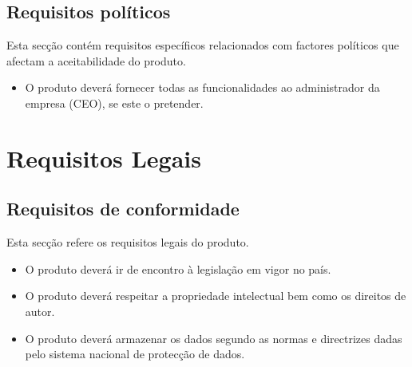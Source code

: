 \subsection{Requisitos políticos}
Esta secção contém requisitos específicos relacionados com factores políticos que afectam a aceitabilidade do produto.
\begin{itemize}
\item O produto deverá fornecer todas as funcionalidades ao administrador da empresa (CEO), se este o pretender.
\end{itemize}

\section{Requisitos Legais}
\subsection{Requisitos de conformidade}
Esta secção refere os requisitos legais do produto.
\begin{itemize}
\item O produto deverá ir de encontro à legislação em vigor no país.
\item O produto deverá respeitar a propriedade intelectual bem como os direitos de autor.
\item O produto deverá armazenar os dados segundo as normas e directrizes dadas pelo sistema nacional de protecção de dados.
\end{itemize}

